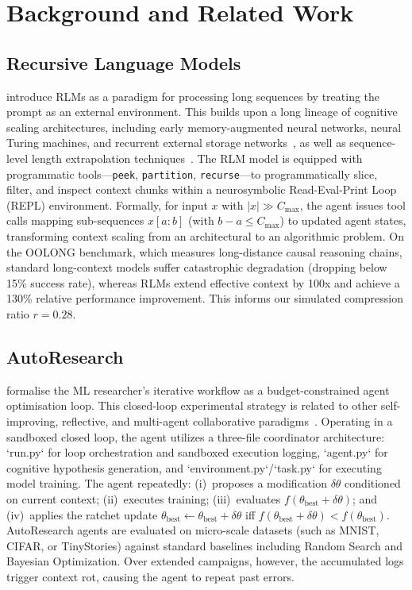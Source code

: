 \documentclass[conference]{IEEEtran}
\newcommand{\Cmax}{C_{\max}}
\newcommand{\tbest}{\theta_{\mathrm{best}}}
\begin{document}
\section{Background and Related Work}
\label{sec:related}
\label{sec:background}

\subsection{Recursive Language Models}
\citet{zhang2025rlm} introduce RLMs as a paradigm for processing long sequences by treating the prompt as an external environment. This builds upon a long lineage of cognitive scaling architectures, including early memory-augmented neural networks, neural Turing machines, and recurrent external storage networks~\citep{weston2014memory,sukhbaatar2015end,graves2014neural}, as well as sequence-level length extrapolation techniques~\citep{dai2019transformer}. The RLM model is equipped with programmatic tools---\texttt{peek}, \texttt{partition}, \texttt{recurse}---to programmatically slice, filter, and inspect context chunks within a neurosymbolic Read-Eval-Print Loop (REPL) environment. Formally, for input $x$ with $|x| \gg \Cmax$, the agent issues tool calls mapping sub-sequences $x[a:b]$ (with $b{-}a \leq \Cmax$) to updated agent states, transforming context scaling from an architectural to an algorithmic problem. On the OOLONG benchmark, which measures long-distance causal reasoning chains, standard long-context models suffer catastrophic degradation (dropping below 15\% success rate), whereas RLMs extend effective context by 100x and achieve a 130\% relative performance improvement. This informs our simulated compression ratio $r{=}0.28$.

\subsection{AutoResearch}
\citet{karpathy2026} formalise the ML researcher's iterative workflow as a budget-constrained agent optimisation loop. This closed-loop experimental strategy is related to other self-improving, reflective, and multi-agent collaborative paradigms~\citep{shinn2023reflexion,wang2023voyager,park2023generative,wu2023autogen}. Operating in a sandboxed closed loop, the agent utilizes a three-file coordinator architecture: `run.py` for loop orchestration and sandboxed execution logging, `agent.py` for cognitive hypothesis generation, and `environment.py`/`task.py` for executing model training. The agent repeatedly: (i)~proposes a modification $\delta\theta$ conditioned on current context; (ii)~executes training; (iii)~evaluates $f(\tbest + \delta\theta)$; and (iv)~applies the ratchet update $\tbest \leftarrow \tbest + \delta\theta$ iff $f(\tbest + \delta\theta) < f(\tbest)$. AutoResearch agents are evaluated on micro-scale datasets (such as MNIST, CIFAR, or TinyStories) against standard baselines including Random Search and Bayesian Optimization. Over extended campaigns, however, the accumulated logs trigger context rot, causing the agent to repeat past errors.
\end{document}
